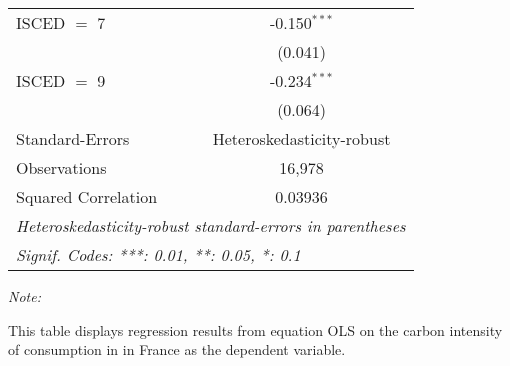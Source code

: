 \begin{table}[htbp!]
\begin{adjustbox}{width = 1\textwidth, max height = 0.95\textheight, center}
\begin{threeparttable}[b]
\begin{tabular}{lc}
            ISCED $=$ 7         & -0.150$^{***}$\\   
                                & (0.041)\\   
            ISCED $=$ 9         & -0.234$^{***}$\\   
                                & (0.064)\\   
            \midrule 
            Standard-Errors     & Heteroskedasticity-robust \\   
            Observations        & 16,978\\  
            Squared Correlation & 0.03936\\  
            \midrule \midrule
            \multicolumn{2}{l}{\emph{Heteroskedasticity-robust standard-errors in parentheses}}\\
            \multicolumn{2}{l}{\emph{Signif. Codes: ***: 0.01, **: 0.05, *: 0.1}}\\
         \end{tabular}
         
         \begin{tablenotes}\item \medskip \textit{Note:}
            \item This table displays regression results from equation OLS on the carbon intensity of consumption in  in France as the dependent variable. 
         \end{tablenotes}
      \end{threeparttable}
   \end{adjustbox}
\end{table}



